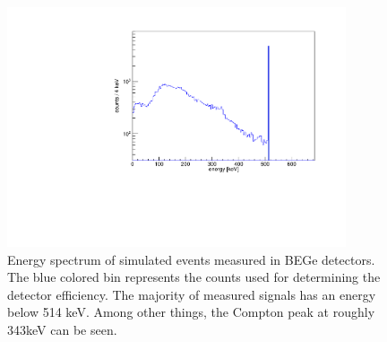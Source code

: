 \documentclass[encoding=utf8,british]{tumphthesis}
\begin{document}
\begin{figure}[t!]
	\centering
	\ifmakefigures%
	\includegraphics[width=100mm]{./Bilder/MC-514-Phasenraum.pdf}
	\fi%
	\caption{
    Energy spectrum of simulated events measured in BEGe detectors.
	The blue colored bin represents the counts used for determining the detector efficiency.
	The majority of measured signals has an energy below 514 keV.
	Among other things, the Compton peak at roughly 343keV can be seen.  
	}
	\label{fig:PhasenraumMC514}
\end{figure}
\end{document}
